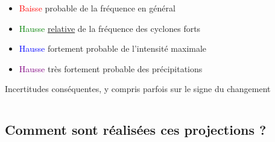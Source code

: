 \documentclass[aspectratio=169, usepdftitle=false, xcolor={dvipsnames}, 9pt,table]{beamer}
\begin{document}
\begin{frame}[c]
\begin{columns}
        \begin{column}{0.25\textwidth}
           \footnotesize
           \setlength{\leftmargini}{2.5ex}
           \begin{block}[Résumé]
               \scriptsize
               \begin{itemize}
                    \item \textcolor{red}{Baisse} probable de la fréquence en général 
                    \item \textcolor{green}{Hausse} \underline{relative} de la fréquence des cyclones forts
                    \item \textcolor{blue}{Hausse} fortement probable de l'intensité maximale
                    \item \textcolor{purple}{Hausse} très fortement probable des précipitations
               \end{itemize}
           \end{block}
           \pause
           \begin{alertblock}
                \scriptsize
                Incertitudes conséquentes, y compris parfois sur le signe du changement
           \end{alertblock}
        \end{column}
    \end{columns}
\end{frame}

\subsection[Méthodologies]{Comment sont réalisées ces projections ?}
\makesubsecslide
\end{document}
